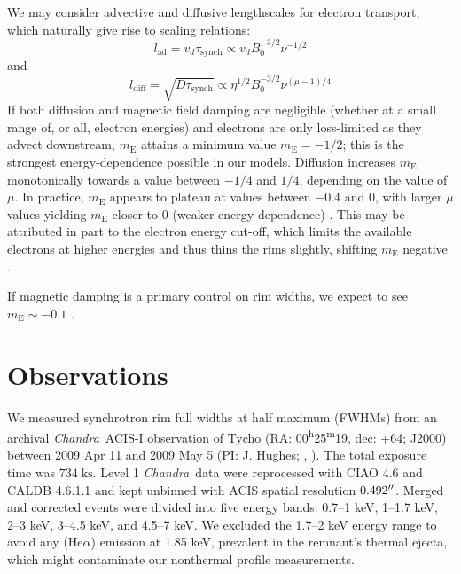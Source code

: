 \documentclass[iop, apj, numberedappendix, twocolappendix]{emulateapj}
\newcommand*{\mt}{\mathrm}
\newcommand*{\unit}[1]{\;\mt{#1}}  %
\newcommand*{\tsup}{\textsuperscript}
\newcommand*{\Chandra}{\textit{Chandra}\ }
\newcommand*{\tsynch}{\tau_{\mt{synch}}}
\newcommand*{\mE}{m_\mt{E}}
\begin{document}
We may consider advective and diffusive lengthscales for electron transport,
which naturally give rise to scaling relations:
\begin{equation} \label{eq:lad}
    l_{\mt{ad}} = v_d \tsynch \propto v_d B_0^{-3/2} \nu^{-1/2}
\end{equation}
and
\begin{equation} \label{eq:ldiff}
    l_{\mt{diff}} = \sqrt{D \tsynch} \propto \eta^{1/2} B_0^{-3/2} \nu^{(\mu-1)/4}
\end{equation}
If both diffusion and magnetic field damping are negligible (whether at a small
range of, or all, electron energies) and electrons are only loss-limited as
they advect downstream, $\mE$ attains a minimum value $\mE = -1/2$; this is the
strongest energy-dependence possible in our models.  Diffusion increases $\mE$
monotonically towards a value between $-1/4$ and $1/4$, depending on the value
of $\mu$.  In practice, $\mE$ appears to plateau at values between $-0.4$ and
$0$, with larger $\mu$ values yielding $\mE$ closer to $0$ (weaker
energy-dependence) .  This may be attributed
in part to the electron energy cut-off, which limits the available electrons at
higher energies and thus thins the rims slightly, shifting $\mE$ negative
.

If magnetic damping is a primary control on rim widths, we expect to see $\mE
\sim -0.1$ .

\section{Observations}
\label{sec:observations}

We measured synchrotron rim full widths at half maximum (FWHMs) from an
archival \Chandra ACIS-I observation of Tycho
(RA: 00\tsup{h}25\tsup{m}19, dec: +64; J2000)
between 2009 Apr 11 and 2009 May 5 (PI: J. Hughes;
,
).
The total exposure time was $734 \unit{ks}$.
Level 1 \Chandra data were reprocessed with CIAO 4.6 and CALDB 4.6.1.1 and kept
unbinned with ACIS spatial resolution $0.492\mbox{$^{\prime\prime}$}$.
Merged and corrected events were divided into five energy bands:
0.7--1 keV, 1--1.7 keV, 2--3 keV, 3--4.5 keV, and 4.5--7 keV.
We excluded the 1.7--2 keV energy range to avoid any  (He$\alpha$)
emission at 1.85 keV, prevalent in the remnant's thermal ejecta, which
might contaminate our nonthermal profile measurements.
\end{document}

